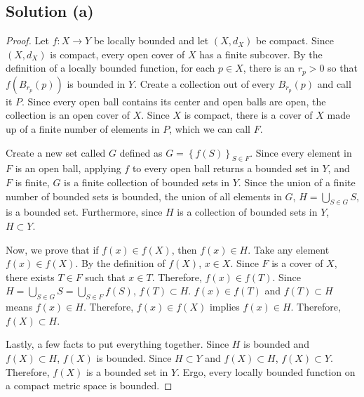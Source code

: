\documentclass[11pt]{article}
\begin{document}
    \subsection{Solution (a)}
        \begin{proof}
            Let $f: X \to Y$ be locally bounded and let $(X, d_X)$ be compact.
            Since $(X, d_X)$ is compact, every open cover of $X$ has a finite subcover.
            By the definition of a locally bounded function, for each $p \in X$, there is an $r_p > 0$ so that $f(B_{r_p}(p))$ is bounded in $Y$.
            Create a collection out of every $B_{r_p}(p)$ and call it $P$.
            Since every open ball contains its center and open balls are open, the collection is an open cover of $X$.
            Since $X$ is compact, there is a cover of $X$ made up of a finite number of elements in $P$, which we can call $F$.
            
            Create a new set called $G$ defined as $G = \left\{ f(S) \right\}_{S \in F}$.
            Since every element in $F$ is an open ball, applying $f$ to every open ball returns a bounded set in $Y$, and $F$ is finite, $G$ is a finite collection of bounded sets in $Y$.
            Since the union of a finite number of bounded sets is bounded, the union of all elements in $G$, $H = \bigcup_{S \in G} S$, is a bounded set.
            Furthermore, since $H$ is a collection of bounded sets in $Y$, $H \subset Y$.

            Now, we prove that if $f(x) \in f(X)$, then $f(x) \in H$.
            Take any element $f(x) \in f(X)$.
            By the definition of $f(X)$, $x \in X$.
            Since $F$ is a cover of $X$, there exists $T \in F$ such that $x \in T$.
            Therefore, $f(x) \in f(T)$.
            Since $H = \bigcup_{S \in G} S = \bigcup_{S \in F} f(S)$, $f(T) \subset H$.
            $f(x) \in f(T)$ and $f(T) \subset H$ means $f(x) \in H$.
            Therefore, $f(x) \in f(X)$ implies $f(x) \in H$.
            Therefore, $f(X) \subset H$.

            Lastly, a few facts to put everything together.
            Since $H$ is bounded and $f(X) \subset H$, $f(X)$ is bounded.
            Since $H \subset Y$ and $f(X) \subset H$, $f(X) \subset Y$.
            Therefore, $f(X)$ is a bounded set in $Y$.
            Ergo, every locally bounded function on a compact metric space is bounded.
        \end{proof}
\end{document}

